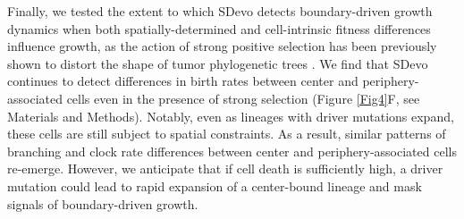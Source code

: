 \documentclass[12pt]{elife_based}
\begin{document}
Finally, we tested the extent to which SDevo detects boundary-driven growth dynamics when both spatially-determined and cell-intrinsic fitness differences influence growth, as the action of strong positive selection has been previously shown to distort the shape of tumor phylogenetic trees \citep{Chkhaidze:2019uw, Heide2021.07.14.451265, Li2022}. We find that SDevo continues to detect differences in birth rates between center and periphery-associated cells even in the presence of strong selection (Figure \ref{Fig4}F, see Materials and Methods). Notably, even as lineages with driver mutations expand, these cells are still subject to spatial constraints. As a result, similar patterns of branching and clock rate differences between center and periphery-associated cells re-emerge. However, we anticipate that if cell death is sufficiently high, a driver mutation could lead to rapid expansion of a center-bound lineage and mask signals of boundary-driven growth.
\end{document}

